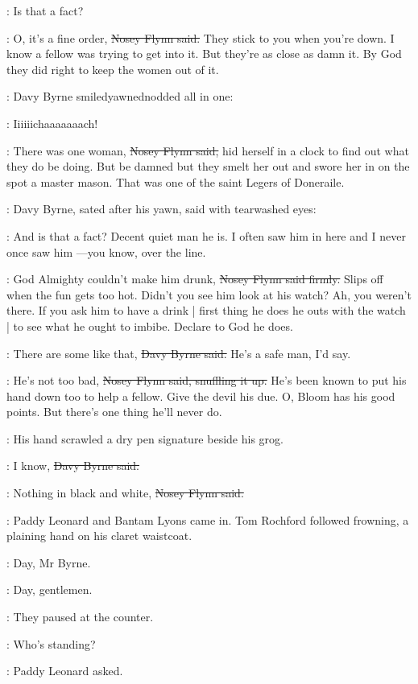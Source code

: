 \davybyrne:
Is that a fact?

\nosey:
O, it's a fine order,
\sout{Nosey Flynn said.}
They stick to you when you're down.
I know a fellow was trying to get into it.
But they're as close as damn it.
By God they did right to keep the women out of it.

:
Davy Byrne smiledyawnednodded all in one:

\davybyrne:
Iiiiiichaaaaaaach!

\nosey:
There was one woman,
\sout{Nosey Flynn said,}
hid herself in a clock to find
out what they do be doing.
But be damned but they smelt her out
and swore her in on the spot a master mason.
That was one of the saint Legers of Doneraile.

:
Davy Byrne,
sated after his yawn,
said with tearwashed eyes:

\davybyrne:
And is that a fact?
Decent quiet man he is.
I often saw him in here
and I never once saw him%
---you know, over the line.

\nosey:
God Almighty couldn't make him drunk,
\sout{Nosey Flynn said firmly.}
Slips off when the fun gets too hot.
Didn't you see him look at his watch?
Ah, you weren't there.
If you ask him to have a drink |
first thing he does he outs with the watch |
to see what he ought to imbibe.
Declare to God he does.

\davybyrne:
There are some like that,
\sout{Davy Byrne said.}
He's a safe man, I'd say.

\nosey:
He's not too bad,
\sout{Nosey Flynn said, snuffling it up.}
He's been known to put his hand down too to help a fellow.
Give the devil his due.
O, Bloom has his good points.
But there's one thing he'll never do.

:
His hand scrawled a dry pen signature beside his grog.

\davybyrne:
I know,
\sout{Davy Byrne said.}

\nosey:
Nothing in black and white,
\sout{Nosey Flynn said.}

:
Paddy Leonard and Bantam Lyons came in.
Tom Rochford followed frowning,
a plaining hand on his claret waistcoat.

\bantam:
Day, Mr Byrne.

\davybyrne:
Day, gentlemen.

:
They paused at the counter.

\leonard:
Who's standing?

:
Paddy Leonard asked.


